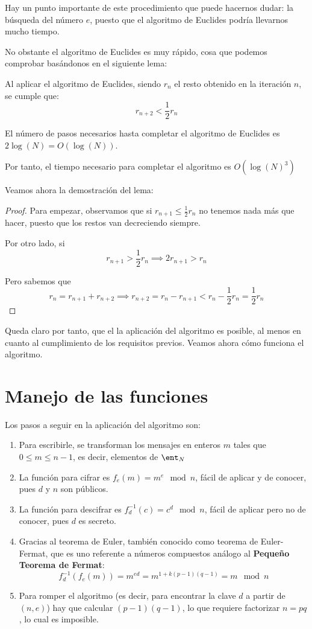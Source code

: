 Hay un punto importante de este procedimiento que puede hacernos dudar: la búsqueda del número $e$, puesto que el algoritmo de Euclides podría llevarnos mucho tiempo.

No obstante el algoritmo de Euclides es muy rápido, cosa que podemos comprobar basándonos en el siguiente lema:
\begin{lemma}
Al aplicar el algoritmo de Euclides, siendo $r_n$ el resto obtenido en la iteración $n$, se cumple que:
\[r_{n+2} < \frac{1}{2}r_n\]
\end{lemma}
\begin{corol}
El número de pasos necesarios hasta completar el algoritmo de Euclides es $2\log(N)=O(\log(N))$.

Por tanto, el tiempo necesario para completar el algoritmo es $O(\log(N)^3)$
\end{corol}

Veamos ahora la demostración del lema:
\begin{proof}
Para empezar, observamos que si $r_{n+1} \leq \frac{1}{2}r_n$ no tenemos nada más que hacer, puesto que los restos van decreciendo siempre.

Por otro lado, si 
\[r_{n+1} > \frac{1}{2} r_n \implies 2r_{n+1} > r_n\]

Pero sabemos que 
\[r_n = r_{n+1} + r_{n+2} \implies r_{n+2} = r_n-r_{n+1} < r_n-\frac{1}{2}r_n = \frac{1}{2}r_n\] 
\end{proof}

Queda claro por tanto, que el la aplicación del algoritmo es posible, al menos en cuanto al cumplimiento de los requisitos previos. Veamos ahora cómo funciona el algoritmo.

\section{Manejo de las funciones}

Los pasos a seguir en la aplicación del algoritmo son:
\begin{enumerate}
\item Para escribirle, se transforman los mensajes en enteros $m$ tales que $0 \leq m \leq n-1$, es decir, elementos de $\ent_N$

\item La función para cifrar es $f_e(m)=m^e \mod n$, fácil de aplicar y de conocer, pues $d$ y $n$ son públicos.

\item La función para descifrar es $f_d^{-1}(c)=c^d \mod n$, fácil de aplicar pero no de conocer, pues $d$ es secreto.

\item Gracias al teorema de Euler, también conocido como teorema de Euler-Fermat, que es uno referente a números compuestos análogo al \textbf{Pequeño Teorema de Fermat}:
\[f_d^{-1}(f_e(m)) = m^{ed} = m^{1+k(p-1)(q-1)} = m \mod n\]

\item Para romper el algoritmo (es decir, para encontrar la clave $d$ a partir de $(n,e)$) hay que calcular $(p-1)(q-1)$, lo que requiere factorizar $n=pq$, lo cual es imposible.

\end{enumerate}

